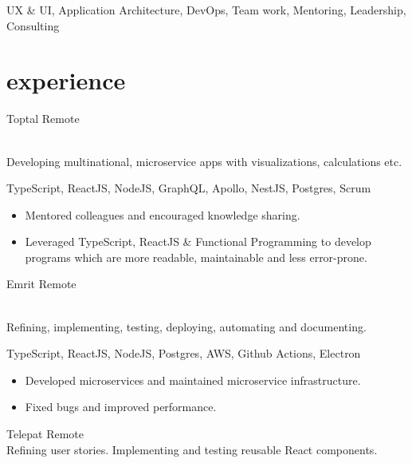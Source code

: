 \documentclass[]{cv-style}          %
\begin{document}
UX \& UI, Application Architecture, DevOps, Team work, Mentoring, Leadership, Consulting


\section{experience}

\begin{entrylist}
  \entry
  {}
  {Toptal}
  {Remote}
  {\\
    Developing multinational, microservice apps with visualizations, calculations etc.\\
    \subtitle{Tech Stack:} TypeScript, ReactJS, NodeJS, GraphQL, Apollo, NestJS, Postgres, Scrum\\
    \subtitle{Detailed achievements:}
    \begin{itemize}
      \item Mentored colleagues and encouraged knowledge sharing.
      \item Leveraged TypeScript, ReactJS \& Functional Programming to develop programs which are more readable, maintainable and less error-prone.
    \end{itemize}}
  \entry
  {}
  {Emrit}
  {Remote}
  {\\
    Refining, implementing, testing, deploying, automating and documenting.\\
    \subtitle{Tech Stack:} TypeScript, ReactJS, NodeJS, Postgres, AWS, Github Actions, Electron\\
    \subtitle{Detailed achievements:}
    \begin{itemize}
      \item Developed microservices and maintained microservice infrastructure.
      \item Fixed bugs and improved performance.
    \end{itemize}}
  \entry
  {}
  {Telepat}
  {Remote}
  {\\
    Refining user stories. Implementing and testing reusable React components.\\
}
\end{entrylist}
\end{document}
